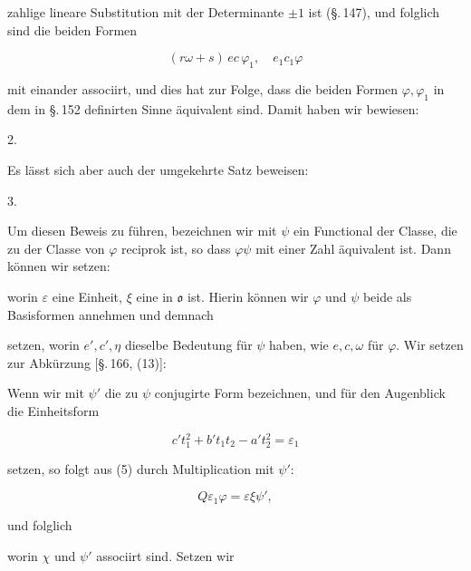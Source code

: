 
zahlige lineare Substitution mit der Determinante $\pm 1$ ist (\S.\,147), und folglich sind die beiden Formen

\[ (r\omega+s)\,ec\,\varphi_1,\quad e_1c_1\varphi \]

mit einander associirt, und dies hat zur Folge, dass die beiden Formen $\varphi,\varphi_1$ in dem in \S.\,152 definirten Sinne äquivalent sind. Damit haben wir bewiesen:

2. 

Es lässt sich aber auch der umgekehrte Satz beweisen:

3. 

Um diesen Beweis zu führen, bezeichnen wir mit $\psi$ ein Functional der Classe, die zu der Classe von $\varphi$ reciprok ist, so dass $\varphi\psi$ mit einer Zahl äquivalent ist. Dann können wir setzen:


worin $\varepsilon$ eine Einheit, $\xi$ eine  in $\mathfrak{o}$ ist. Hierin können wir $\varphi$ und $\psi$ beide als Basisformen annehmen und demnach


setzen, worin $e', c', \eta$ dieselbe Bedeutung für $\psi$ haben, wie $e,c,\omega$ für $\varphi$. Wir setzen zur Abkürzung [\S.\,166, (13)]:


Wenn wir mit $\psi'$ die zu $\psi$ conjugirte Form bezeichnen, und für den Augenblick die Einheitsform

\[ c't_1^2 + b't_1t_2 - a't_2^2 = \varepsilon_1 \]

setzen, so folgt aus (5) durch Multiplication mit $\psi'$:

\[ Q\varepsilon_1\varphi = \varepsilon\xi\psi', \]

und folglich


worin $\chi$ und $\psi'$ associirt sind. Setzen wir

